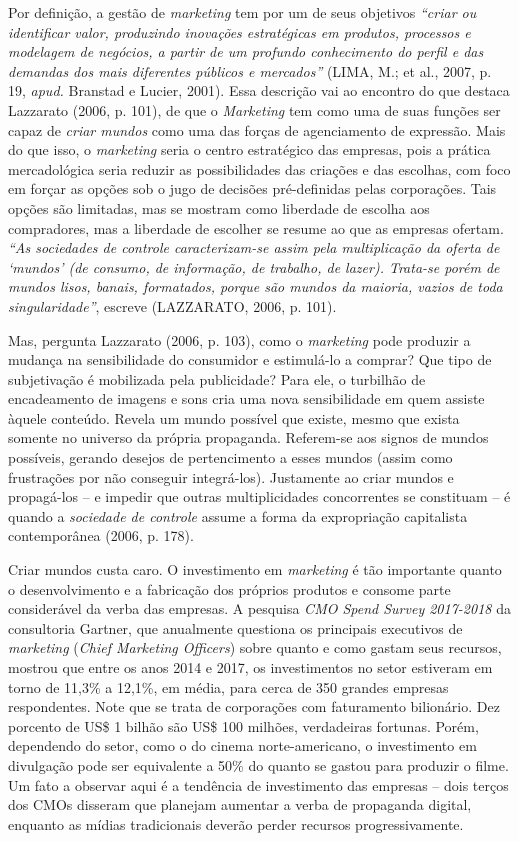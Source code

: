 Por definição, a gestão de \emph{marketing} tem por um de seus objetivos
\emph{``criar ou identificar valor, produzindo inovações estratégicas em
produtos, processos e modelagem de negócios, a partir de um profundo
conhecimento do perfil e das demandas dos mais diferentes públicos e
mercados''} (LIMA, M.; et al., 2007, p. 19, \emph{apud.} Branstad e
Lucier, 2001). Essa descrição vai ao encontro do que destaca Lazzarato
(2006, p. 101), de que o \emph{Marketing} tem como uma de suas funções
ser capaz de \emph{criar mundos} como uma das forças de agenciamento de
expressão. Mais do que isso, o \emph{marketing} seria o centro
estratégico das empresas, pois a prática mercadológica seria reduzir as
possibilidades das criações e das escolhas, com foco em forçar as opções
sob o jugo de decisões pré-definidas pelas corporações. Tais opções são
limitadas, mas se mostram como liberdade de escolha aos compradores, mas
a liberdade de escolher se resume ao que as empresas ofertam. \emph{``As
sociedades de controle caracterizam-se assim pela multiplicação da
oferta de `mundos' (de consumo, de informação, de trabalho, de lazer).
Trata-se porém de mundos lisos, banais, formatados, porque são mundos da
maioria, vazios de toda singularidade''}, escreve (LAZZARATO, 2006, p.
101).

Mas, pergunta Lazzarato (2006, p. 103), como o \emph{marketing} pode
produzir a mudança na sensibilidade do consumidor e estimulá-lo a
comprar? Que tipo de subjetivação é mobilizada pela publicidade? Para
ele, o turbilhão de encadeamento de imagens e sons cria uma nova
sensibilidade em quem assiste àquele conteúdo. Revela um mundo possível
que existe, mesmo que exista somente no universo da própria propaganda.
Referem-se aos signos de mundos possíveis, gerando desejos de
pertencimento a esses mundos (assim como frustrações por não conseguir
integrá-los). Justamente ao criar mundos e propagá-los -- e impedir que
outras multiplicidades concorrentes se constituam -- é quando a
\emph{sociedade de controle} assume a forma da expropriação capitalista
contemporânea (2006, p. 178).

Criar mundos custa caro. O investimento em \emph{marketing} é tão
importante quanto o desenvolvimento e a fabricação dos próprios produtos
e consome parte considerável da verba das empresas. A pesquisa \emph{CMO
Spend Survey 2017-2018} da consultoria Gartner, que anualmente questiona
os principais executivos de \emph{marketing} (\emph{Chief Marketing
Officers}) sobre quanto e como gastam seus recursos, mostrou que entre
os anos 2014 e 2017, os investimentos no setor estiveram em torno de
11,3\% a 12,1\%, em média, para cerca de 350 grandes empresas
respondentes. Note que se trata de corporações com faturamento
bilionário. Dez porcento de US\$ 1 bilhão são US\$ 100 milhões,
verdadeiras fortunas. Porém, dependendo do setor, como o do cinema
norte-americano, o investimento em divulgação pode ser equivalente a
50\% do quanto se gastou para produzir o filme. Um fato a observar aqui
é a tendência de investimento das empresas -- dois terços dos CMOs
disseram que planejam aumentar a verba de propaganda digital, enquanto
as mídias tradicionais deverão perder recursos progressivamente.

